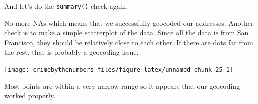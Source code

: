 \documentclass[
]{krantz}
\makeatletter
\newenvironment{Shaded}{\begin{snugshade}}{\end{snugshade}}
\newcommand{\AttributeTok}[1]{\textcolor[rgb]{0.61,0.61,0.61}{#1}}
\newcommand{\CommentTok}[1]{\textcolor[rgb]{0.37,0.37,0.37}{\textit{#1}}}
\newcommand{\ConstantTok}[1]{\textcolor[rgb]{0,0,0}{#1}}
\newcommand{\FunctionTok}[1]{\textcolor[rgb]{0,0,0}{#1}}
\newcommand{\NormalTok}[1]{#1}
\newcommand{\OtherTok}[1]{\textcolor[rgb]{0.37,0.37,0.37}{#1}}
\newcommand{\SpecialCharTok}[1]{\textcolor[rgb]{0,0,0}{#1}}
\newcommand{\StringTok}[1]{\textcolor[rgb]{0.5,0.5,0.5}{#1}}
\newenvironment{kframe}{%
\medskip{}
\setlength{\fboxsep}{.8em}
 \def\at@end@of@kframe{}%
 \ifinner\ifhmode%
  \def\at@end@of@kframe{\end{minipage}}%
  \begin{minipage}{\columnwidth}%
 \fi\fi%
 \def\FrameCommand##1{\hskip\@totalleftmargin \hskip-\fboxsep
 \colorbox{shadecolor}{##1}\hskip-\fboxsep
     \hskip-\linewidth \hskip-\@totalleftmargin \hskip\columnwidth}%
 \MakeFramed {\advance\hsize-\width
   \@totalleftmargin\z@ \linewidth\hsize
   \@setminipage}}%
 {\par\unskip\endMakeFramed%
 \at@end@of@kframe}
\renewenvironment{Shaded}{\begin{kframe}}{\end{kframe}}
\makeatother
\begin{document}
\begin{Shaded}
\end{Shaded}

And let's do the \texttt{summary()} check again.

\begin{Shaded}
\end{Shaded}

\begin{Shaded}
\end{Shaded}

No more NAs which means that we successfully geocoded our addresses. Another check is to make a simple scatterplot of the data. Since all the data is from San Francisco, they should be relatively close to each other. If there are dots far from the rest, that is probably a geocoding issue.

\begin{Shaded}
\end{Shaded}

\begin{center}\texttt{[image: crimebythenumbers\_files/figure-latex/unnamed-chunk-25-1]} \end{center}

Most points are within a very narrow range so it appears that our geocoding worked properly.

  

\backmatter
\printindex
\end{document}
